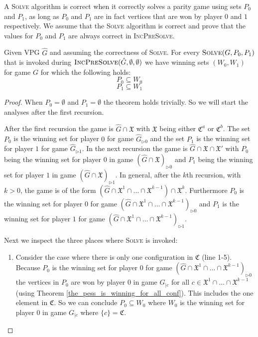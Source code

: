 A \textsc{Solve} algorithm is correct when it correctly solves a parity game using sets $P_0$ and $P_1$, as long as $P_0$ and $P_1$ are in fact vertices that are won by player $0$ and $1$ respectively. We assume that the \textsc{Solve} algorithm is correct and prove that the values for $P_0$ and $P_1$ are always correct in \textsc{IncPreSolve}.
\begin{lemma}
	Given VPG $\hat{G}$ and assuming the correctness of \textsc{Solve}. For every $\textsc{Solve}(G,P_0,P_1)$ that is invoked during $\textsc{IncPreSolve}(\hat{G},\emptyset,\emptyset)$ we have winning sets $(W_0,W_1)$ for game $G$ for which the following holds:
	\[ P_0 \subseteq  W_0 \]
	\[ P_1 \subseteq  W_1 \]
	\begin{proof}
		\label{lem_P0_and_P1_are_always_correct}
		When $P_0 = \emptyset$ and $P_1 = \emptyset$ the theorem holds trivially. So we will start the analyses after the first recursion. 
		
		After the first recursion the game is $\hat{G} \cap \mathfrak{X}$ with $\mathfrak{X}$ being either $\mathfrak{C}^a$ or $\mathfrak{C}^b$. The set $P_0$ is the winning set for player $0$ for game $\hat{G}_{\triangleright0}$ and the set $P_1$ is the winning set for player $1$ for game $\hat{G}_{\triangleright1}$. In the next recursion the game is $\hat{G} \cap \mathfrak{X} \cap \mathfrak{X}'$ with $P_0$ being the winning set for player $0$ in game $(\hat{G} \cap \mathfrak{X})_{\triangleright0}$ and $P_1$ being the winning set for player $1$ in game $(\hat{G} \cap \mathfrak{X})_{\triangleright1}$. In general, after the $k$th recursion, with $k > 0$, the game is of the form  $(\hat{G} \cap \mathfrak{X}^1 \cap \dots \cap \mathfrak{X}^{k-1}) \cap \mathfrak{X}^k$. Furthermore $P_0$ is the winning set for player $0$ for game $(\hat{G} \cap \mathfrak{X}^1 \cap \dots \cap \mathfrak{X}^{k-1})_{\triangleright0}$ and $P_1$ is the winning set for player $1$ for game $(\hat{G} \cap \mathfrak{X}^1 \cap \dots \cap \mathfrak{X}^{k-1})_{\triangleright1}$.
		
		Next we inspect the three places where \textsc{Solve} is invoked:
		\begin{enumerate}
			\item Consider the case where there is only one configuration in $\mathfrak{C}$ (line 1-5). Because $P_0$ is the winning set for player $0$ for game $(\hat{G} \cap \mathfrak{X}^1 \cap \dots \cap \mathfrak{X}^{k-1})_{\triangleright0}$ the vertices in $P_0$ are won by player $0$ in game $G_{|c}$ for all $c \in \mathfrak{X}^1 \cap \dots \cap \mathfrak{X}^{k-1}$ (using Theorem \ref{the_pess_is_winning_for_all_conf}). This includes the one element in $\mathfrak{C}$. So we can conclude $P_0 \subseteq W_0$ where $W_0$ is the winning set for player $0$ in game $G_{|c}$ where $\{c\} = \mathfrak{C}$.
			

\end{enumerate}
\end{proof}
\end{lemma}
